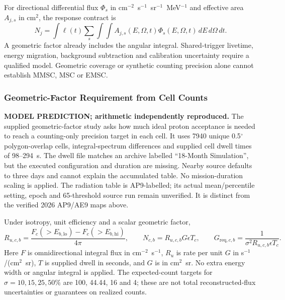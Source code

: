 For directional differential flux $\Phi_s$ in cm$^{-2}$~s$^{-1}$~sr$^{-1}$~MeV$^{-1}$ and effective area $A_{j,s}$ in cm$^2$, the response contract is
\begin{equation}
N_j=\int\ell(t)\sum_s\int\!\int A_{j,s}(E,\Omega,t)\Phi_s(E,\Omega,t)\,dE\,d\Omega\,dt.
\end{equation}
A geometric factor already includes the angular integral. Shared-trigger livetime, energy migration, background subtraction and calibration uncertainty require a qualified model. Geometric coverage or synthetic counting precision alone cannot establish MMSC, MSC or EMSC.

\subsubsection{Geometric-Factor Requirement from Cell Counts}\label{app:required-g}
\textbf{MODEL PREDICTION; arithmetic independently reproduced.}
The supplied geometric-factor study asks how much ideal proton acceptance is needed to reach a counting-only precision target in each cell. It uses 7940 unique 0.5$^\circ$ polygon-overlap cells, integral-spectrum differences and supplied cell dwell times of 98--294~s. The dwell file matches an archive labelled ``18-Month Simulation'', but the executed configuration and duration are missing. Nearby source defaults to three days and cannot explain the accumulated table. No mission-duration scaling is applied. The radiation table is AP9-labelled; its actual mean/percentile setting, epoch and 65-threshold source run remain unverified. It is distinct from the verified 2026 AP9/AE9 maps above.

Under isotropy, unit efficiency and a scalar geometric factor,
\begin{equation}
R_{u,c,b}=\frac{F_c(>E_{b,\mathrm{lo}})-F_c(>E_{b,\mathrm{hi}})}{4\pi},\qquad
N_{c,b}=R_{u,c,b}G\epsilon T_c,\qquad
G_{\mathrm{req},c,b}=\frac{1}{\sigma^2R_{u,c,b}\epsilon T_c}.
\end{equation}
Here $F$ is omnidirectional integral flux in cm$^{-2}$~s$^{-1}$, $R_u$ is rate per unit $G$ in s$^{-1}$/(cm$^2$~sr), $T$ is supplied dwell in seconds, and $G$ is in cm$^2$~sr. No extra energy width or angular integral is applied. The expected-count targets for $\sigma=10,15,25,50\%$ are 100, 44.44, 16 and 4; these are not total reconstructed-flux uncertainties or guarantees on realized counts.


